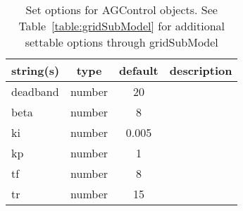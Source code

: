 \begin{table}[ht]
\centering
\begin{tabular}{p{5cm} c c p{7cm}}
\hline
string(s) & type & default & description \\
\hline
deadband & number & 20 & \\
beta & number & 8 & \\
ki & number & 0.005 & \\
kp & number & 1 & \\
tf & number & 8 & \\
tr & number & 15 & \\
\hline
\end{tabular}
\caption{Set options for AGControl objects. See Table~\ref{table:gridSubModel} for additional settable options through gridSubModel}
\label{table:AGControl}
\end{table}
